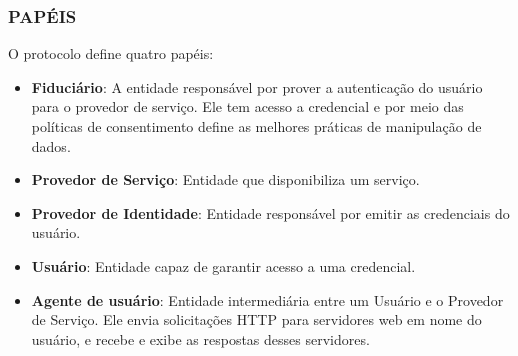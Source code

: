 \subsubsection{PAPÉIS}

O protocolo define quatro papéis: 

\begin{itemize}
    \item \textbf{Fiduciário}: A entidade responsável por prover a autenticação do usuário para o provedor de serviço. Ele tem acesso a credencial e por meio das políticas de consentimento define as melhores práticas de manipulação de dados.
    \item \textbf{Provedor de Serviço}: Entidade que disponibiliza um serviço.
    \item \textbf{Provedor de Identidade}: Entidade responsável por emitir as credenciais do usuário.
    \item \textbf{Usuário}: Entidade capaz de garantir acesso a uma credencial.
    \item \textbf{Agente de usuário}: Entidade intermediária entre um Usuário e o Provedor de Serviço. Ele envia solicitações HTTP para servidores web em nome do usuário, e recebe e exibe as respostas desses servidores. 
\end{itemize}